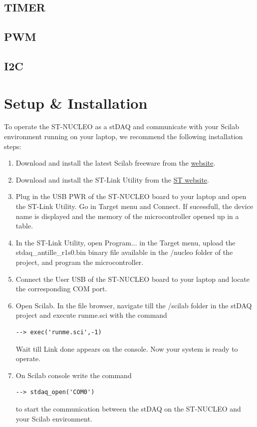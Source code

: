 \documentclass[letterpaper,10pt,english]{hitec}
\begin{document}
\hrulefill

\subsection{TIMER}

\subsection{PWM}

\subsection{I2C}

\newpage

\section{Setup \& Installation}

To operate the ST-NUCLEO as a stDAQ and communicate with your Scilab environment running on your laptop, we recommend the following installation steps:
\begin{enumerate}
\item Download and install the latest Scilab freeware from the \href{https://www.scilab.org/}{website}.
\item Download and install the ST-Link Utility from the \href{https://www.st.com/en/development-tools/stsw-link004.html}{ST website}.
\item Plug in the USB PWR of the ST-NUCLEO board to your laptop and open the ST-Link Utility. Go in Target menu and Connect. If sucessfull, the device name is displayed and the memory of the microcontroller opened up in a table. 
\item In the ST-Link Utility, open Program... in the Target menu, upload the stdaq\_antille\_r1s0.bin binary file available in the /nucleo folder of the project, and program the microcontroller. 
\item Connect the User USB of the ST-NUCLEO board to your laptop and locate the corresponding COM port.
\item Open Scilab. In the file browser, navigate till the /scilab folder in the stDAQ project and execute runme.sci with the command
\begin{verbatim}
--> exec('runme.sci',-1)
\end{verbatim}
Wait till Link done appears on the console. Now your system is ready to operate.
\item On Scilab console write the command 
\begin{verbatim}
--> stdaq_open('COM0')
\end{verbatim}
to start the communication between the stDAQ on the ST-NUCLEO and your Scilab environment.
\end{enumerate}
\end{document}
